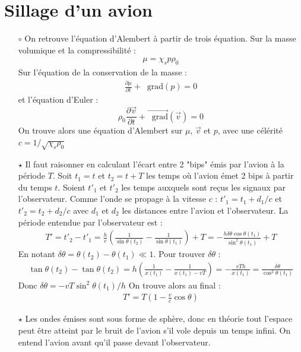 \documentclass{report}
\newcommand*\grad{\mathop{}\!\mathrm{grad}}
\begin{document}
\section*{Sillage d'un avion}

\begin{itemize}

	\item[$\circ$] On retrouve l'équation d'Alembert à partir de trois équation. Sur la masse volumique et la compressibilité :
	\begin{align*}
		\mu = \chi_sp\rho_0
	\end{align*}
	Sur l'équation de la conservation de la masse :
	\begin{align*}
		\frac{\partial \mu}{\partial t}+\grad(p)=0
	\end{align*}
	et l'équation d'Euler :
	\begin{equation}
		\rho_0\frac{\partial \vec{v}}{\partial t}+\vec{\grad}(\vec{v})=0
	\end{equation}
	On trouve alors une équation d'Alembert sur $\mu$, $\vec{v}$ et $p$, avec une célérité $c=1/\sqrt{\chi_s\rho_0}$

	\item[$\star$] Il faut raisonner en calculant l'écart entre 2 "bips" émis par l'avion à la période $T$. Soit $t_1=t$ et $t_2=t+T$ les temps où l'avion émet 2 bips à partir du temps $t$. Soient $t'_1$ et $t'_2$ les temps auxquels sont reçus les signaux par l'observateur. Comme l'onde se propage à la vitesse $c$ : $t'_1=t_1+d_1/c$ et $t'_2=t_2+d_2/c$ avec $d_1$ et $d_2$ les distances entre l'avion et l'observateur. La période entendue par l'observateur est :
	\begin{align*}
		T'=t'_2-t'_1=\frac{h}{c}\left(\frac{1}{\sin\theta(t_2)}-\frac{1}{\sin\theta(t_1)} \right) +T=-\frac{h\delta\theta\cos\theta(t_1)}{\sin^2\theta(t_1)} +T 
	\end{align*}
	En notant $\delta\theta=\theta(t_2)-\theta(t_1)\ll1$. Pour trouver $\delta\theta$ :
	\begin{align*}
		\tan\theta(t_2)-\tan\theta(t_2)=h\left(\frac{1}{x(t_1)}-\frac{1}{x(t_1)-vT} \right) =-\frac{vTh}{x(t_1)}=\frac{\delta\theta}{\cos^2\theta(t_1)}
	\end{align*}
	Donc $\delta\theta=-vT\sin^2\theta(t_1)/h$
	On trouve alors au final :
	\begin{align*}
		T'=T\left(1-\frac{v}{c}\cos\theta \right) 
	\end{align*}
	\item[$\star$] Les ondes émises sont sous forme de sphère, donc en théorie tout l'espace peut être atteint par le bruit de l'avion s'il vole depuis un temps infini. On entend l'avion avant qu'il passe devant l'observateur.


\end{itemize}
\end{document}
